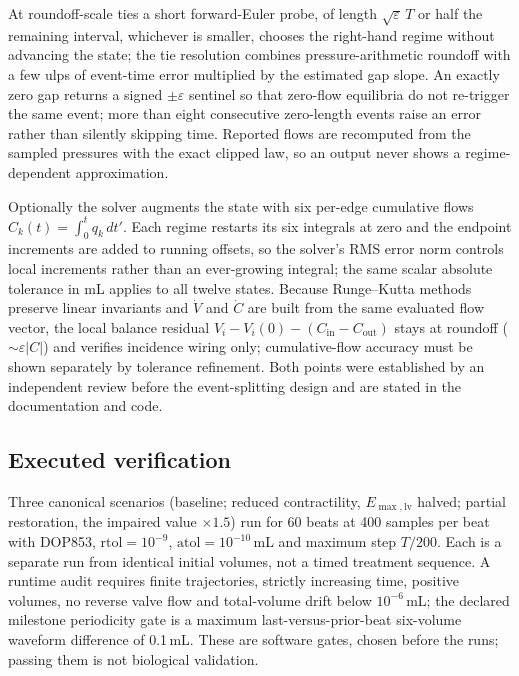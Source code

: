 \documentclass[11pt,letterpaper]{article}
\begin{document}
At roundoff-scale ties a short forward-Euler probe, of length $\sqrt{\varepsilon}\,T$ or half the remaining interval, whichever is smaller, chooses the right-hand regime without advancing the state; the tie resolution combines pressure-arithmetic roundoff with a few ulps of event-time error multiplied by the estimated gap slope. An exactly zero gap returns a signed $\pm\varepsilon$ sentinel so that zero-flow equilibria do not re-trigger the same event; more than eight consecutive zero-length events raise an error rather than silently skipping time. Reported flows are recomputed from the sampled pressures with the exact clipped law, so an output never shows a regime-dependent approximation.

Optionally the solver augments the state with six per-edge cumulative flows $C_k(t)=\int_0^t q_k\,dt'$. Each regime restarts its six integrals at zero and the endpoint increments are added to running offsets, so the solver's RMS error norm controls local increments rather than an ever-growing integral; the same scalar absolute tolerance in mL applies to all twelve states. Because Runge--Kutta methods preserve linear invariants and $\dot V$ and $\dot C$ are built from the same evaluated flow vector, the local balance residual $V_i-V_i(0)-(C_{\mathrm{in}}-C_{\mathrm{out}})$ stays at roundoff ($\sim\varepsilon|C|$) and verifies incidence wiring only; cumulative-flow accuracy must be shown separately by tolerance refinement. Both points were established by an independent review before the event-splitting design and are stated in the documentation and code.

\subsection{Executed verification}
\label{sec:verification}

Three canonical scenarios (baseline; reduced contractility, $E_{\max,\mathrm{lv}}$ halved; partial restoration, the impaired value $\times 1.5$) run for 60 beats at 400 samples per beat with DOP853, $\mathrm{rtol}=10^{-9}$, $\mathrm{atol}=10^{-10}$\,mL and maximum step $T/200$. Each is a separate run from identical initial volumes, not a timed treatment sequence. A runtime audit requires finite trajectories, strictly increasing time, positive volumes, no reverse valve flow and total-volume drift below $10^{-6}$\,mL; the declared milestone periodicity gate is a maximum last-versus-prior-beat six-volume waveform difference of 0.1\,mL. These are software gates, chosen before the runs; passing them is not biological validation.
\end{document}
